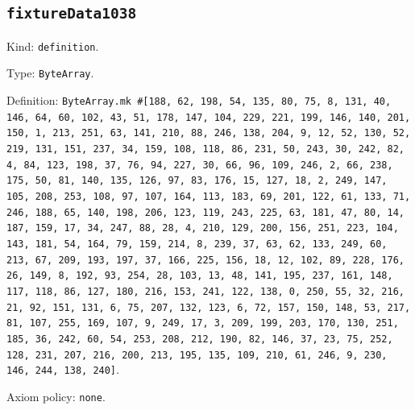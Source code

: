 \documentclass[11pt]{article}
\begin{document}
\subsection*{\texttt{fixtureData1038}}
\noindent Kind: \texttt{definition}.\par
\noindent Type: \texttt{ByteArray}.\par
\noindent Definition: \texttt{ByteArray.mk \#[188, 62, 198, 54, 135, 80, 75, 8, 131, 40, 146, 64, 60, 102, 43, 51, 178, 147, 104, 229, 221, 199, 146, 140, 201, 150, 1, 213, 251, 63, 141, 210, 88, 246, 138, 204, 9, 12, 52, 130, 52, 219, 131, 151, 237, 34, 159, 108, 118, 86, 231, 50, 243, 30, 242, 82, 4, 84, 123, 198, 37, 76, 94, 227, 30, 66, 96, 109, 246, 2, 66, 238, 175, 50, 81, 140, 135, 126, 97, 83, 176, 15, 127, 18, 2, 249, 147, 105, 208, 253, 108, 97, 107, 164, 113, 183, 69, 201, 122, 61, 133, 71, 246, 188, 65, 140, 198, 206, 123, 119, 243, 225, 63, 181, 47, 80, 14, 187, 159, 17, 34, 247, 88, 28, 4, 210, 129, 200, 156, 251, 223, 104, 143, 181, 54, 164, 79, 159, 214, 8, 239, 37, 63, 62, 133, 249, 60, 213, 67, 209, 193, 197, 37, 166, 225, 156, 18, 12, 102, 89, 228, 176, 26, 149, 8, 192, 93, 254, 28, 103, 13, 48, 141, 195, 237, 161, 148, 117, 118, 86, 127, 180, 216, 153, 241, 122, 138, 0, 250, 55, 32, 216, 21, 92, 151, 131, 6, 75, 207, 132, 123, 6, 72, 157, 150, 148, 53, 217, 81, 107, 255, 169, 107, 9, 249, 17, 3, 209, 199, 203, 170, 130, 251, 185, 36, 242, 60, 54, 253, 208, 212, 190, 82, 146, 37, 23, 75, 252, 128, 231, 207, 216, 200, 213, 195, 135, 109, 210, 61, 246, 9, 230, 146, 244, 138, 240]}.\par
\noindent Axiom policy: \texttt{none}.\par
\end{document}
